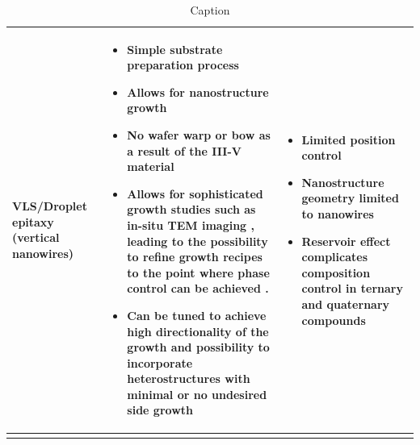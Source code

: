 \begin{table}
\begin{longtable}{p{}|p{}|p{}}
    VLS/Droplet epitaxy (vertical nanowires) & 
    \begin{itemize}
        \item Simple substrate preparation process
        \item Allows for nanostructure growth \cite{Wagner1964}
        \item No wafer warp or bow as a result of the III-V material
        \item Allows for sophisticated growth studies such as in-situ TEM imaging \cite{Maliakkal2020, Jacobsson2016, Harmand2018}, leading to the possibility to refine growth recipes to the point where phase control can be achieved \cite{Algra2008, Caroff2009, Joyce2007}.
        \item Can be tuned to achieve high directionality of the growth and possibility to incorporate heterostructures with minimal or no undesired side growth \cite{Harmand2018, Joyce2007}
    \end{itemize}  & \begin{itemize}
        \item Limited position control \cite{Joyce2007}
        \item Nanostructure geometry limited to nanowires \cite{Wagner1964}
        \item Reservoir effect complicates composition control in ternary and quaternary compounds \cite{Dubrovskii2017}
    \end{itemize} \\ \hline
    \caption{Caption}
    \label{tab:methods1}
\end{longtable}
\end{table}
